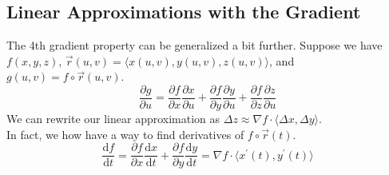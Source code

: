 \subsection{Linear Approximations with the Gradient}
\noindent
The 4th gradient property can be generalized a bit further. Suppose we have $f(x,y,z)$, $\vec{r}(u,v) = \langle x(u,v), y(u,v), z(u,v) \rangle$, and $g(u,v) = f\circ\vec{r}(u,v)$.
\begin{equation*}
	\frac{\partial g}{\partial u} = \frac{\partial f}{\partial x}\frac{\partial x}{\partial u} + \frac{\partial f}{\partial y}\frac{\partial y}{\partial u} + \frac{\partial f}{\partial z}\frac{\partial z}{\partial u}
\end{equation*}
\noindent
We can rewrite our linear approximation as $\Delta z\approx\nabla f\cdot\langle \Delta x, \Delta y\rangle$.\\
In fact, we how have a way to find derivatives of $f\circ\vec{r}(t)$.
\begin{equation*}
	\frac{\mathrm{d}f}{\mathrm{d}t} = \frac{\partial f}{\partial x}\frac{\mathrm{d}x}{\mathrm{d}t} + \frac{\partial f}{\partial y}\frac{\mathrm{d}y}{\mathrm{d}t} = \nabla f \cdot \langle x^{\prime}(t), y^{\prime}(t) \rangle
\end{equation*}